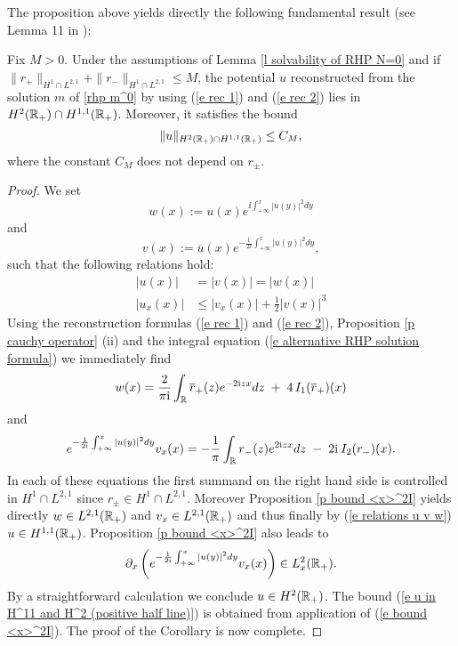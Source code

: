 The proposition above yields directly the following fundamental result (see Lemma 11 in \cite{Pelinovsky2016}):
\begin{cor}\label{c u in H^11 and H^2 (positive half line)}
   Fix $M>0$. Under the assumptions of Lemma \ref{l solvability of RHP N=0} and if $\|r_+\|_{H^1\cap L^{2,1}}+\|r_-\|_{H^1\cap L^{2,1}}\leq M$, the potential $u$ reconstructed from the solution $m$ of \rh \ref{rhp m^0} by using (\ref{e rec 1}) and (\ref{e rec 2}) lies in $H^2(\mathbb R_+)\cap H^{1,1}(\mathbb R_+)$. Moreover, it satisfies the bound
   \begin{equation}\label{e u in H^11 and H^2 (positive half line)}
       \|u\|_{H^2(\mathbb R_+)\cap H^{1,1}(\mathbb R_+)}\leq C_M,
   \end{equation}
   where the constant $C_M$ does not depend on $r_{\pm}$.
\end{cor}
\begin{proof}
    We set
    \begin{equation}\label{e def w}
        w(x):=u(x)e^{\ii\int_{+\infty}^x|u(y)|^2dy}
    \end{equation}
    and
    \begin{equation}\label{e def v}
        v(x):=\overline{u}(x)e^{-\frac{1}{2\ii} \int_{+\infty}^x|u(y)|^2dy},
    \end{equation}
    such that the following relations hold:
    \begin{equation}\label{e relations u v w}
        \begin{aligned}
            |u(x)|&=|v(x)|=|w(x)|\\
            |u_x(x)|&\leq |v_x(x)|+\frac{1}{2}|v(x)|^3
        \end{aligned}
    \end{equation}
    Using the reconstruction formulas (\ref{e rec 1}) and (\ref{e rec 2}), Proposition \ref{p cauchy operator} (ii) and the integral equation (\ref{e alternative RHP solution formula}) we immediately find
    \begin{equation*}
        w(x)=\frac{2}{\pi\mathrm{i}}\int_{\mathbb R}\overline{r}_+(z) e^{-2\mathrm{i} zx}dz\;+\;4\,I_1(\overline{r}_+)(x)
    \end{equation*}
    and
    \begin{equation*}
        e^{-\frac{1}{2\mathrm{i}} \int_{+\infty}^x|u(y)|^2dy}v_x(x)
        =-\frac{1}{\pi}\int_{\mathbb R}r_-(z) e^{2\mathrm{i} zx}dz\;-\;2\mathrm{i}\:I_2(r_-)(x).
    \end{equation*}
    In each of these equations the first summand on the right hand side is controlled in $H^1\cap L^{2,1}$ since $r_{\pm}\in H^1\cap L^{2,1}$. Moreover Proposition \ref{p bound <x>^2I} yields directly $w\in L^{2,1}(\mathbb R_+)$ and $v_x\in L^{2,1}(\mathbb R_+)$ and thus finally by (\ref{e relations u v w}) $u\in H^{1,1}(\mathbb R_+)$. Proposition \ref{p bound <x>^2I} also leads to
    \begin{equation*}
        \partial_x\left(e^{-\frac{1}{2\mathrm{i}} \int_{+\infty}^x|u(y)|^2dy}v_x(x)\right)\in L^2_x(\mathbb R_+).
    \end{equation*}
    By a straightforward calculation we conclude $u\in H^2(\mathbb R_+)$. The bound (\ref{e u in H^11 and H^2 (positive half line)}) is obtained from application of (\ref{e bound <x>^2I}). The proof of the Corollary is now complete.
\end{proof}
